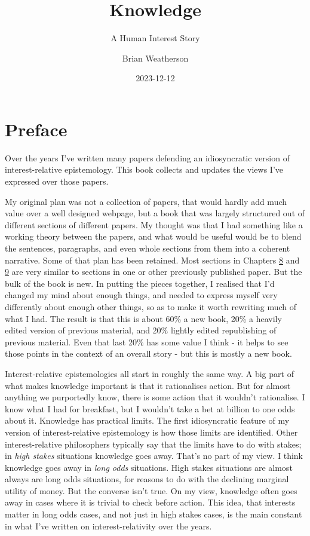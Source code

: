 \documentclass[
  12pt,
  letterpaper,
]{scrbook}
\title{Knowledge}
\subtitle{A Human Interest Story}
\author{Brian Weatherson}
\date{2023-12-12}
\renewcommand*\contentsname{Table of contents}
\newcommand\contentsname{Table of contents}
\begin{document}
\frontmatter
\maketitle

\renewcommand*\contentsname{Table of contents}
{
\hypersetup{linkcolor=}
\setcounter{tocdepth}{2}
\tableofcontents
}
\mainmatter
{}

\chapter*{Preface}\label{sec-preface}


Over the years I've written many papers defending an idiosyncratic
version of interest-relative epistemology. This book collects and
updates the views I've expressed over those papers.

My original plan was not a collection of papers, that would hardly add
much value over a well designed webpage, but a book that was largely
structured out of different sections of different papers. My thought was
that I had something like a working theory between the papers, and what
would be useful would be to blend the sentences, paragraphs, and even
whole sections from them into a coherent narrative. Some of that plan
has been retained. Most sections in Chapters \hyperref[sec-ratbel]{8}
and \hyperref[sec-evidence]{9} are very similar to sections in one or
other previously published paper. But the bulk of the book is new. In
putting the pieces together, I realised that I'd changed my mind about
enough things, and needed to express myself very differently about
enough other things, so as to make it worth rewriting much of what I
had. The result is that this is about 60\% a new book, 20\% a heavily
edited version of previous material, and 20\% lightly edited
republishing of previous material. Even that last 20\% has some value I
think - it helps to see those points in the context of an overall story
- but this is mostly a new book.

Interest-relative epistemologies all start in roughly the same way. A
big part of what makes knowledge important is that it rationalises
action. But for almost anything we purportedly know, there is some
action that it wouldn't rationalise. I know what I had for breakfast,
but I wouldn't take a bet at billion to one odds about it. Knowledge has
practical limits. The first idiosyncratic feature of my version of
interest-relative epistemology is how those limits are identified. Other
interest-relative philosophers typically say that the limits have to do
with stakes; in \emph{high stakes} situations knowledge goes away.
That's no part of my view. I think knowledge goes away in \emph{long
odds} situations. High stakes situations are almost always are long odds
situations, for reasons to do with the declining marginal utility of
money. But the converse isn't true. On my view, knowledge often goes
away in cases where it is trivial to check before action. This idea,
that interests matter in long odds cases, and not just in high stakes
cases, is the main constant in what I've written on interest-relativity
over the years.
\end{document}
